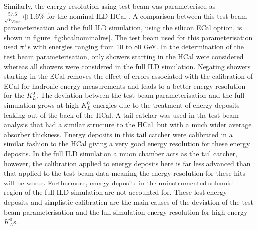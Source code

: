 Similarly, the energy resolution using test beam was parameterised as $\frac{57.6}{\sqrt{E_{Reco}}} \oplus 1.6 \%$ for the nominal ILD HCal \cite{Adloff:2012gv}.  A comparison between this test beam parameterisation and the full ILD simulation, using the silicon ECal option, is shown in figure \ref{fig:hcalnominalres}.  The test beam used for this parameterisation used $\pi^{\pm}$s with energies ranging from 10 to 80 GeV.  In the determination of the test beam parameterisation, only showers starting in the HCal were considered whereas all showers were considered in the full ILD simulation.  Negating showers starting in the ECal removes the effect of errors associated with the calibration of ECal for hadronic energy measurements and leads to a better energy resolution for the $K^{0}_{L}$.  The deviation between the test beam parameterisation and the full simulation grows at high $K^{0}_{L}$ energies due to the treatment of energy deposits leaking out of the back of the HCal.  A tail catcher was used in the test beam analysis that had a similar structure to the HCal, but with a much wider average absorber thickness.  Energy deposits in this tail catcher were calibrated in a similar fashion to the HCal giving a very good energy resolution for these energy deposits.  In the full ILD simulation a muon chamber acts as the tail catcher, however, the calibration applied to energy deposits here is far less advanced than that applied to the test beam data meaning the energy resolution for these hits will be worse.  Furthermore, energy deposits in the uninstrumented solenoid region of the full ILD simulation are not accounted for.  These lost energy deposits and simplistic calibration are the main causes of the deviation of the test beam parameterisation and the full simulation energy resolution for high energy $K^{0}_{L}$s.   

